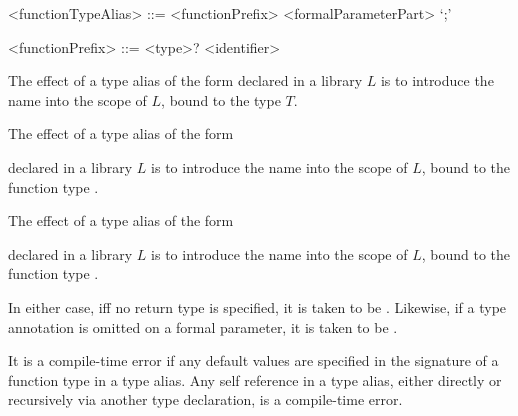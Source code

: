 \documentclass[makeidx]{article}
\begin{document}
{\begin{grammar}
<functionTypeAlias> ::= <functionPrefix> <formalParameterPart> `;'

<functionPrefix> ::= <type>? <identifier>
\end{grammar}

\LMHash{}%
The effect of a type alias of the form
declared in a library $L$ is to introduce the name \id{} into the scope of $L$,
bound to the type $T$.

\LMHash{}%
The effect of a type alias of the form

\noindent
{}

\noindent
declared in a library $L$ is to introduce the name \id{} into the scope of $L$, bound to the function type
.

\LMHash{}%
The effect of a type alias of the form

\noindent
{}

\noindent
declared in a library $L$ is to introduce the name \id{} into the scope of $L$, bound to the function type
.

\LMHash{}%
In either case, if{}f no return type is specified, it is taken to be \DYNAMIC{}.
Likewise, if a type annotation is omitted on a formal parameter, it is taken to be \DYNAMIC{}.

\LMHash{}%
It is a compile-time error if any default values are specified
in the signature of a function type in a type alias.
Any self reference in a type alias,
either directly or recursively via another type declaration,
is a compile-time error.


}
\end{document}
